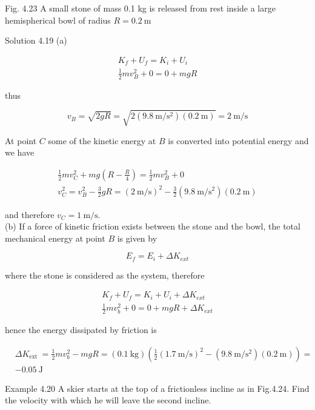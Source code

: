 \documentclass[10pt]{article}
\begin{document}
Fig. 4.23 A small stone of mass 0.1 kg is released from rest inside a large hemispherical bowl of radius $R=0.2 \mathrm{~m}$

Solution 4.19 (a)

$$
\begin{gathered}
K_{f}+U_{f}=K_{i}+U_{i} \\
\frac{1}{2} m v_{B}^{2}+0=0+m g R
\end{gathered}
$$

thus

$$
v_{B}=\sqrt{2 g R}=\sqrt{2\left(9.8 \mathrm{~m} / \mathrm{s}^{2}\right)(0.2 \mathrm{~m})}=2 \mathrm{~m} / \mathrm{s}
$$

At point $C$ some of the kinetic energy at $B$ is converted into potential energy and we have

$$
\begin{gathered}
\frac{1}{2} m v_{C}^{2}+m g\left(R-\frac{R}{4}\right)=\frac{1}{2} m v_{B}^{2}+0 \\
v_{C}^{2}=v_{B}^{2}-\frac{3}{2} g R=(2 \mathrm{~m} / \mathrm{s})^{2}-\frac{3}{2}\left(9.8 \mathrm{~m} / \mathrm{s}^{2}\right)(0.2 \mathrm{~m})
\end{gathered}
$$

and therefore $v_{C}=1 \mathrm{~m} / \mathrm{s}$.\\
(b) If a force of kinetic friction exists between the stone and the bowl, the total mechanical energy at point $B$ is given by

$$
E_{f}=E_{i}+\Delta K_{e x t}
$$

where the stone is considered as the system, therefore

$$
\begin{gathered}
K_{f}+U_{f}=K_{i}+U_{i}+\Delta K_{e x t} \\
\frac{1}{2} m v_{b}^{2}+0=0+m g R+\Delta K_{e x t}
\end{gathered}
$$

hence the energy dissipated by friction is

$$
\begin{aligned}
& \Delta K_{\text {ext }}=\frac{1}{2} m v_{b}^{2}-m g R=(0.1 \mathrm{~kg})\left(\frac{1}{2}(1.7 \mathrm{~m} / \mathrm{s})^{2}-\left(9.8 \mathrm{~m} / \mathrm{s}^{2}\right)(0.2 \mathrm{~m})\right)= \\
& -0.05 \mathrm{~J}
\end{aligned}
$$

Example 4.20 A skier starts at the top of a frictionless incline as in Fig.4.24. Find the velocity with which he will leave the second incline.
\end{document}

